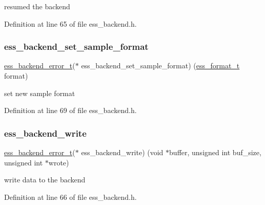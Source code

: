 resumed the backend 

Definition at line 65 of file ess\+\_\+backend.\+h.

\mbox{\label{structess__backend_af8790cbdeabfcdafa015466bdb552ac2}} 
\subsubsection{\texorpdfstring{ess\+\_\+backend\+\_\+set\+\_\+sample\+\_\+format}{ess\_backend\_set\_sample\_format}}
{\footnotesize\ttfamily \hyperlink{ess__backend_8h_aa3de0496a3f361a6b38684e9cb65f01c}{ess\+\_\+backend\+\_\+error\+\_\+t}($\ast$  ess\+\_\+backend\+\_\+set\+\_\+sample\+\_\+format) (\hyperlink{ess__format_8h_ab03f24cb5d42f4448f713bf1ec178163}{ess\+\_\+format\+\_\+t} format)}

set new sample format 

Definition at line 69 of file ess\+\_\+backend.\+h.

\mbox{\label{structess__backend_a3a1b32830c82ec84aa0e6c02280d7f6c}} 
\subsubsection{\texorpdfstring{ess\+\_\+backend\+\_\+write}{ess\_backend\_write}}
{\footnotesize\ttfamily \hyperlink{ess__backend_8h_aa3de0496a3f361a6b38684e9cb65f01c}{ess\+\_\+backend\+\_\+error\+\_\+t}($\ast$  ess\+\_\+backend\+\_\+write) (void $\ast$buffer, unsigned int buf\+\_\+size, unsigned int $\ast$wrote)}

write data to the backend 

Definition at line 66 of file ess\+\_\+backend.\+h.

\mbox{\label{structess__backend_a9f29adb0a4cfb608557d26692fa78254}} 
